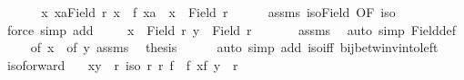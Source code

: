 \begin{isabellebody}
%
\isadelimproof
%
\endisadelimproof
%
\isatagproof
{}\isamarkupfalse%
\ {\isacharminus}{\kern0pt}\isanewline
\ \ \isamarkupfalse%
\ {\isasymsection}{\isacharcolon}{\kern0pt}\ {\isachardoublequoteopen}{\isasymAnd}x{\isachardot}{\kern0pt}\ {\isacharparenleft}{\kern0pt}{\isasymexists}xa{\isasymin}Field\ r{\isachardot}{\kern0pt}\ x\ {\isacharequal}{\kern0pt}\ f\ xa{\isacharparenright}{\kern0pt}\ {\isacharequal}{\kern0pt}\ {\isacharparenleft}{\kern0pt}x\ {\isasymin}\ Field\ r{\isacharprime}{\kern0pt}{\isacharparenright}{\kern0pt}{\isachardoublequoteclose}\isanewline
\ \ \ \ \isamarkupfalse%
\ assms\ iso{\isacharunderscore}{\kern0pt}Field\ {\isacharbrackleft}{\kern0pt}OF\ iso{\isacharbrackright}{\kern0pt}\ \isamarkupfalse%
\ {\isacharparenleft}{\kern0pt}force\ simp\ add{\isacharcolon}{\kern0pt}\ {\isacharparenright}{\kern0pt}\isanewline
\ \ \isamarkupfalse%
\ {\isachardoublequoteopen}x\ {\isasymin}\ Field\ r{\isacharprime}{\kern0pt}{\isachardoublequoteclose}\ {\isachardoublequoteopen}y\ {\isasymin}\ Field\ r{\isacharprime}{\kern0pt}{\isachardoublequoteclose}\ \isanewline
\ \ \ \ \isamarkupfalse%
\ assms\ \isamarkupfalse%
\ {\isacharparenleft}{\kern0pt}auto\ simp{\isacharcolon}{\kern0pt}\ Field{\isacharunderscore}{\kern0pt}def{\isacharparenright}{\kern0pt}\isanewline
\ \ \isamarkupfalse%
\ {\isasymsection}\ {\isacharbrackleft}{\kern0pt}of\ x{\isacharbrackright}{\kern0pt}\ {\isasymsection}\ {\isacharbrackleft}{\kern0pt}of\ y{\isacharbrackright}{\kern0pt}\ assms\ \isamarkupfalse%
\ {\isacharquery}{\kern0pt}thesis\isanewline
\ \ \ \ \isamarkupfalse%
\ {\isacharparenleft}{\kern0pt}auto\ simp\ add{\isacharcolon}{\kern0pt}\ iso{\isacharunderscore}{\kern0pt}iff{}\ bij{\isacharunderscore}{\kern0pt}betw{\isacharunderscore}{\kern0pt}inv{\isacharunderscore}{\kern0pt}into{\isacharunderscore}{\kern0pt}left{\isacharparenright}{\kern0pt}\isanewline
{}\isamarkupfalse%
%
\endisatagproof
{\isafoldproof}%
%
\isadelimproof
\isanewline
%
\endisadelimproof
\isanewline
{}\isamarkupfalse%
\ iso{\isacharunderscore}{\kern0pt}forward{\isacharcolon}{\kern0pt}\isanewline
\ \ \ {\isachardoublequoteopen}{\isacharparenleft}{\kern0pt}x{\isacharcomma}{\kern0pt}y{\isacharparenright}{\kern0pt}\ {\isasymin}\ r{\isachardoublequoteclose}\ {\isachardoublequoteopen}iso\ r\ r{\isacharprime}{\kern0pt}\ f{\isachardoublequoteclose}\ \ {\isachardoublequoteopen}{\isacharparenleft}{\kern0pt}f\ x{\isacharcomma}{\kern0pt}f\ y{\isacharparenright}{\kern0pt}\ {\isasymin}\ r{\isacharprime}{\kern0pt}{\isachardoublequoteclose}\ \isanewline

\end{isabellebody}
